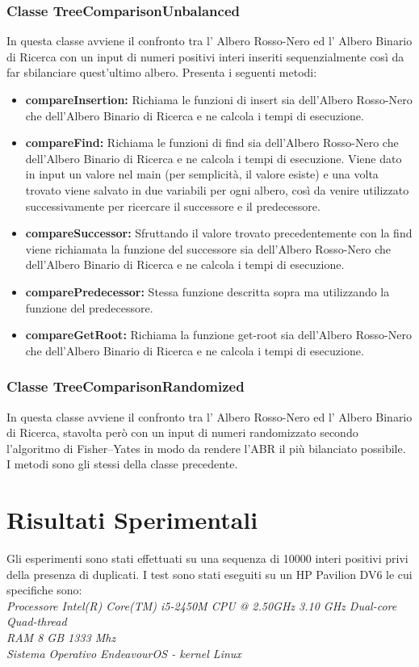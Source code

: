 \documentclass{article}
\begin{document}
\subsubsection{Classe TreeComparisonUnbalanced}
In questa  classe avviene il confronto tra l' Albero Rosso-Nero ed l' Albero Binario di Ricerca con un input di numeri positivi interi inseriti sequenzialmente così da far sbilanciare quest'ultimo albero.
Presenta i seguenti metodi:
\begin{itemize}
    \item \textbf{compareInsertion:} Richiama le funzioni di insert sia dell'Albero Rosso-Nero che dell'Albero Binario di Ricerca e ne calcola i tempi di esecuzione.
    \item \textbf{compareFind:} Richiama le funzioni di find sia dell'Albero Rosso-Nero che dell'Albero Binario di Ricerca e ne calcola i tempi di esecuzione. Viene dato in input un valore nel main (per semplicità, il valore esiste) e una volta trovato viene salvato in due variabili per ogni albero, così da venire utilizzato successivamente per ricercare il successore e il predecessore.
    \item \textbf{compareSuccessor:} Sfruttando il valore trovato precedentemente con la find viene richiamata la funzione del successore sia dell'Albero Rosso-Nero che dell'Albero Binario di Ricerca e ne calcola i tempi di esecuzione.
    \item \textbf{comparePredecessor:} Stessa funzione descritta sopra ma utilizzando la funzione del predecessore.
    \item \textbf{compareGetRoot:} Richiama la funzione get-root sia dell'Albero Rosso-Nero che dell'Albero Binario di Ricerca e ne calcola i tempi di esecuzione.
\end{itemize}

\subsubsection{Classe TreeComparisonRandomized}
In questa  classe avviene il confronto tra l' Albero Rosso-Nero ed l' Albero Binario di Ricerca, stavolta però con un input di numeri randomizzato secondo l'algoritmo di Fisher–Yates in modo da rendere l'ABR il più bilanciato possibile.
I metodi sono gli stessi della classe precedente.

\section{Risultati Sperimentali}
Gli esperimenti sono stati effettuati su una sequenza di 10000 interi positivi privi della presenza di duplicati.
I test sono stati eseguiti su un HP Pavilion DV6 le cui specifiche sono:\\
\textit{Processore Intel(R) Core(TM) i5-2450M CPU @ 2.50GHz 3.10 GHz Dual-core Quad-thread\\}
\textit{RAM 8 GB 1333 Mhz\\}
\textit{Sistema Operativo EndeavourOS - kernel Linux\\}
\end{document}
